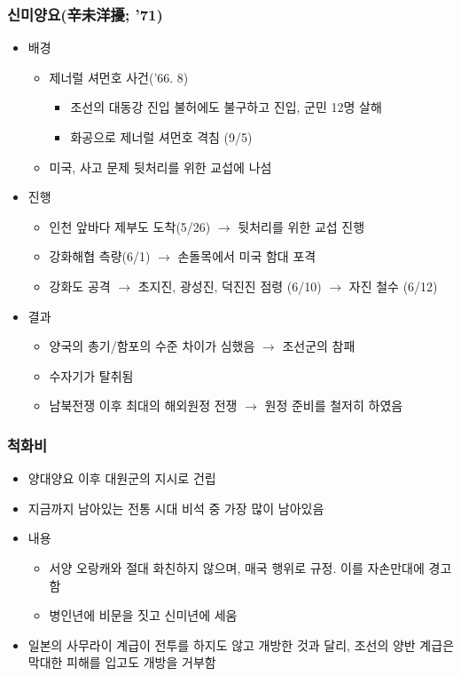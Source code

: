 \subsubsection*{신미양요(辛未洋擾; '71)}
\begin{itemize}
    \item 배경
    \begin{itemize}
        \item 제너럴 셔먼호 사건('66. 8)
        \begin{itemize}
            \item 조선의 대동강 진입 불허에도 불구하고 진입, 군민 12명 살해
            \item 화공으로 제너럴 셔먼호 격침 (9/5)
        \end{itemize}
        \item 미국, 사고 문제 뒷처리를 위한 교섭에 나섬
    \end{itemize}
    \item 진행
    \begin{itemize}
        \item 인천 앞바다 제부도 도착(5/26) $\rightarrow$ 뒷처리를 위한 교섭 진행
        \item 강화해협 측량(6/1) $\rightarrow$ 손돌목에서 미국 함대 포격
        \item 강화도 공격 $\rightarrow$ 초지진, 광성진, 덕진진 점령 (6/10) $\rightarrow$ 자진 철수 (6/12)
    \end{itemize}
    \item 결과
    \begin{itemize}
        \item 양국의 총기/함포의 수준 차이가 심했음 $\rightarrow$ 조선군의 참패
        \item 수자기가 탈취됨
        \item 남북전쟁 이후 최대의 해외원정 전쟁 $\rightarrow$ 원정 준비를 철저히 하였음
    \end{itemize}
\end{itemize}

\subsubsection*{척화비}

\begin{itemize}
    \item 양대양요 이후 대원군의 지시로 건립
    \item 지금까지 남아있는 전통 시대 비석 중 가장 많이 남아있음
    \item 내용
    \begin{itemize}
        \item 서양 오랑캐와 절대 화친하지 않으며, 매국 행위로 규정. 이를 자손만대에 경고함
        \item 병인년에 비문을 짓고 신미년에 세움
    \end{itemize}
    \item 일본의 사무라이 계급이 전투를 하지도 않고 개방한 것과 달리, 조선의 양반 계급은 막대한 피해를 입고도 개방을 거부함
\end{itemize}
